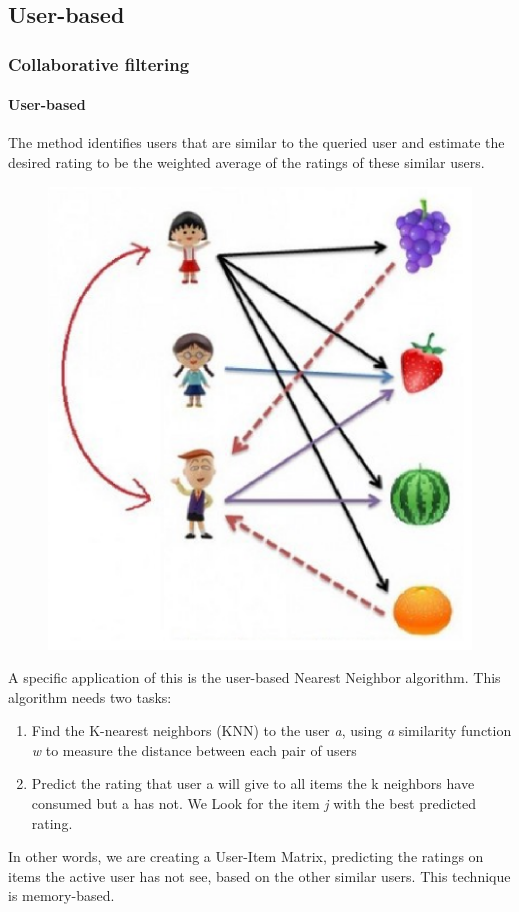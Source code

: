 \subsection{User-based}
\begin{frame}
	\frametitle{Collaborative filtering}
	\framesubtitle{User-based}
	\raggedright
	\begin{minipage}{0.5\linewidth}
         The method identifies users that are similar to the queried user and estimate the desired rating to be the weighted average of the ratings of these similar users.
	\end{minipage}
    \begin{minipage}{0.5\linewidth}
        \begin{figure}
            \includegraphics[scale=0.2]{figures/userbased.png}
		\end{figure}
    \end{minipage}
    \newpage
    A specific application of this is the user-based Nearest Neighbor algorithm. This algorithm needs two tasks:
    \begin{enumerate}
        \item Find the K-nearest neighbors (KNN) to the user \textit{a}, using \textit{a} similarity function \textit{w} to measure the distance between each pair of users
        \item Predict the rating that user a will give to all items the k neighbors have consumed but a has not. We Look for the item \textit{j} with the best predicted rating.
    \end{enumerate}
    In other words, we are creating a User-Item Matrix, predicting the ratings on items the active user has not see, based on the other similar users. 
    This technique is memory-based.
\end{frame}
